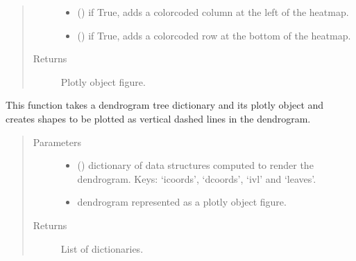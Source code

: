 \documentclass[letterpaper,10pt,english]{sphinxmanual}
\begin{document}
\begin{fulllineitems}
\begin{quote}
\begin{description}
\begin{itemize}
\item {} 
 () \textendash{} if True, adds a color\sphinxhyphen{}coded column at the left of the heatmap.

\item {} 
 () \textendash{} if True, adds a color\sphinxhyphen{}coded row at the bottom of the heatmap.

\end{itemize}

\item[{Returns}] \leavevmode
Plotly object figure.

\end{description}\end{quote}

\end{fulllineitems}


\begin{fulllineitems}
\label{\detokenize{_autosummary/analytics_core.viz:analytics_core.viz.wgcnaFigures.plot_dendrogram_guidelines}}
This function takes a dendrogram tree dictionary and its plotly object and creates shapes to be plotted as vertical dashed lines in the dendrogram.
\begin{quote}\begin{description}
\item[{Parameters}] \leavevmode\begin{itemize}
\item {} 
 () \textendash{} dictionary of data structures computed to render the dendrogram. Keys: ‘icoords’, ‘dcoords’, ‘ivl’ and ‘leaves’.

\item {} 
 \textendash{} dendrogram represented as a plotly object figure.

\end{itemize}

\item[{Returns}] \leavevmode
List of dictionaries.

\end{description}\end{quote}

\end{fulllineitems}
\end{document}
